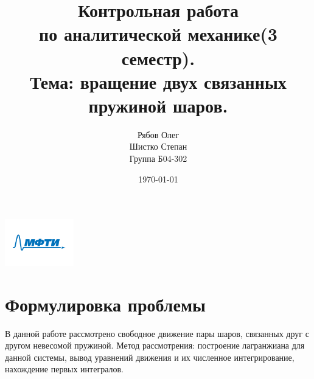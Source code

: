 \documentclass[a4paper, 12pt]{article}
\begin{document}
\begin{titlepage}
    \title{Контрольная работа\\
    по аналитической механике(3 семестр).\\
    Тема: вращение двух связанных пружиной шаров.
    }
    \author{Рябов Олег \\
    Шистко Степан\\
    Группа Б04-302}
    \date{\today}
    \maketitle
    \vfill
    \begin{center}
        \includegraphics[width=30mm]{./pictures/MIPT.png}
    \end{center}
\end{titlepage}

\setcounter{page}{2}
\tableofcontents
\newpage
\section{Формулировка проблемы}
В данной работе рассмотрено свободное движение пары шаров, связанных друг с другом невесомой пружиной. Метод рассмотрения: построение лагранжиана для данной системы, вывод уравнений движения и их численное интегрирование, нахождение первых интегралов.
\end{document}
